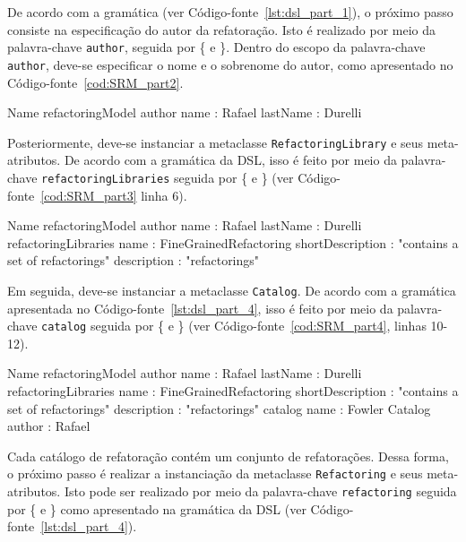 De acordo com a gramática (ver Código-fonte~\ref{lst:dsl_part_1}), o próximo passo consiste na especificação do autor da refatoração. Isto é realizado por meio da palavra-chave \texttt{author}, seguida por \{ e \}. Dentro do escopo da palavra-chave \texttt{author}, deve-se especificar o nome e o sobrenome do autor, como apresentado no Código-fonte~\ref{cod:SRM_part2}.

\begin{codigo}[caption={[Exemplo de uso da DSL - parte 2.] Exemplo de uso da DSL - parte 2.},escapeinside={(*@}{@*)}, basicstyle=\footnotesize, label={cod:SRM_part2}, language=myDSL]{Name}
refactoringModel {
    author {
		name : Rafael
		lastName : Durelli
	}
}
\end{codigo}

Posteriormente, deve-se instanciar a metaclasse \texttt{RefactoringLibrary} e seus meta-atributos. De acordo com a gramática da DSL, isso é feito por meio da palavra-chave \texttt{refactoring\-Libraries} seguida por \{ e \} (ver Código-fonte~\ref{cod:SRM_part3} linha 6). 

\begin{codigo}[caption={[Exemplo de uso da DSL - parte 3.] Exemplo de uso da DSL - parte 3.},escapeinside={(*@}{@*)}, basicstyle=\footnotesize, label={cod:SRM_part3}, language=myDSL]{Name}
refactoringModel {
    author {
		name : Rafael
		lastName : Durelli
	}
	refactoringLibraries {
	    name : FineGrainedRefactoring
		shortDescription : "contains a set of refactorings"
		description : "refactorings"
	}
}
\end{codigo}

Em seguida, deve-se instanciar a metaclasse \texttt{Catalog}. De acordo com a gramática apresentada no Código-fonte~\ref{lst:dsl_part_4}, isso é feito por meio da palavra-chave \texttt{catalog} seguida por \{ e \} (ver Código-fonte~\ref{cod:SRM_part4}, linhas 10-12).

\begin{codigo}[caption={[Exemplo de uso da DSL - parte 4.] Exemplo de uso da DSL - parte 4.},escapeinside={(*@}{@*)}, basicstyle=\footnotesize, label={cod:SRM_part4}, language=myDSL]{Name}
refactoringModel {
    author {
		name : Rafael
		lastName : Durelli
	}
	refactoringLibraries {
	    name : FineGrainedRefactoring
		shortDescription : "contains a set of refactorings"
		description : "refactorings"
		catalog {
			name : Fowler Catalog
			author : Rafael
		}
	}
}
\end{codigo}

Cada catálogo de refatoração contém um conjunto de refatorações. Dessa forma, o próximo passo é realizar a instanciação da metaclasse \texttt{Refactoring} e seus meta-atributos. Isto pode ser realizado por meio da palavra-chave \texttt{refactoring} seguida por \{ e \} como apresentado na gramática da DSL (ver Código-fonte~\ref{lst:dsl_part_4}).

